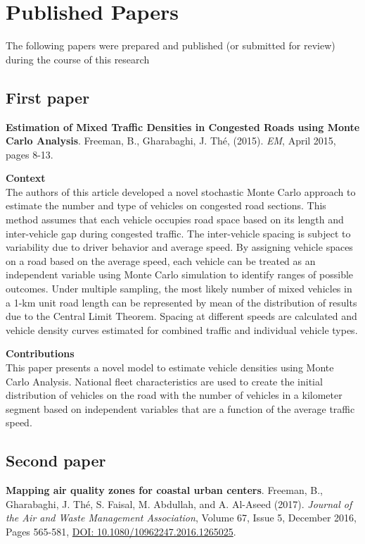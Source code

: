 
\chapter{Published Papers}

The following papers were prepared and published (or submitted for review) during the course of this research

\section{First paper}
\noindent
\textbf{Estimation of Mixed Traffic Densities in Congested Roads using Monte Carlo Analysis}. Freeman, B., Gharabaghi, J.  Th\'e, (2015). \textit{EM}, April 2015, pages 8-13. 

\vspace{5mm}
\noindent
\textbf{Context}\\
\noindent
The authors of this article developed a novel stochastic Monte Carlo approach to estimate the number and type of vehicles on congested road sections. This method assumes that each vehicle occupies road space based on its length and inter-vehicle gap during congested traffic. The inter-vehicle spacing is subject to variability due to driver behavior and average speed. By assigning vehicle spaces on a road based on the average speed, each vehicle can be treated as an independent variable using Monte Carlo simulation to identify ranges of possible outcomes. Under multiple sampling, the most likely number of mixed vehicles in a 1-km unit road length can be represented by mean of the distribution of results due to the Central Limit Theorem. Spacing at different speeds are calculated and vehicle density curves estimated for combined traffic and individual vehicle types.

\vspace{5mm}
\noindent
\textbf{Contributions}\\
\noindent
This paper presents a novel model to estimate vehicle densities using Monte Carlo Analysis. National fleet characteristics are used to create the initial distribution of vehicles on the road with the number of vehicles in a kilometer segment based on independent variables that are a function of the average traffic speed. 

\noindent
\section{Second paper}
\noindent
\textbf{Mapping air quality zones for coastal urban centers}. Freeman, B., Gharabaghi, J.  Th\'e, S. Faisal, M. Abdullah, and A. Al-Aseed (2017). \textit{Journal of the Air and Waste Management Association}, Volume 67, Issue 5, December 2016, Pages 565-581, \url{ DOI: 10.1080/10962247.2016.1265025}.

